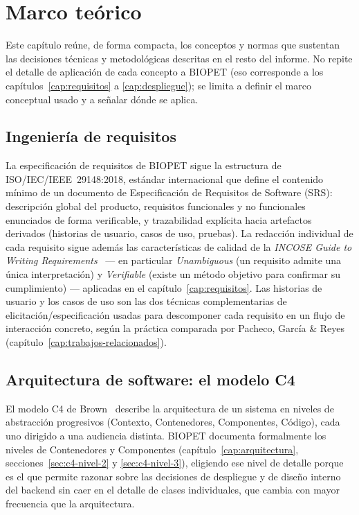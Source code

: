 \chapter{Marco te\'orico}
\label{cap:marco-teorico}

Este cap\'itulo re\'une, de forma compacta, los conceptos y normas que
sustentan las decisiones t\'ecnicas y metodol\'ogicas descritas en el resto
del informe. No repite el detalle de aplicaci\'on de cada concepto a
BIOPET (eso corresponde a los cap\'itulos~\ref{cap:requisitos} a
\ref{cap:despliegue}); se limita a definir el marco conceptual usado y a
se\~nalar d\'onde se aplica.

\section{Ingenier\'ia de requisitos}

La especificaci\'on de requisitos de BIOPET sigue la estructura de
ISO/IEC/IEEE~29148:2018, est\'andar internacional que define el contenido
m\'inimo de un documento de Especificaci\'on de Requisitos de Software
(SRS): descripci\'on global del producto, requisitos funcionales y no
funcionales enunciados de forma verificable, y trazabilidad expl\'icita
hacia artefactos derivados (historias de usuario, casos de uso, pruebas).
La redacci\'on individual de cada requisito sigue adem\'as las
caracter\'isticas de calidad de la \emph{INCOSE Guide to Writing
Requirements}~\cite{incose2023requirements} --- en particular
\emph{Unambiguous} (un requisito admite una \'unica interpretaci\'on) y
\emph{Verifiable} (existe un m\'etodo objetivo para confirmar su
cumplimiento) --- aplicadas en el cap\'itulo~\ref{cap:requisitos}. Las
historias de usuario y los casos de uso son las dos t\'ecnicas
complementarias de elicitaci\'on/especificaci\'on usadas para descomponer
cada requisito en un flujo de interacci\'on concreto, seg\'un la pr\'actica
comparada por Pacheco, Garc\'ia \& Reyes~\cite{pacheco2018requirements}
(cap\'itulo~\ref{cap:trabajos-relacionados}).

\section{Arquitectura de software: el modelo C4}

El modelo C4 de Brown~\cite{c4-model} describe la arquitectura de un
sistema en niveles de abstracci\'on progresivos (Contexto, Contenedores,
Componentes, C\'odigo), cada uno dirigido a una audiencia distinta. BIOPET
documenta formalmente los niveles de Contenedores y Componentes
(cap\'itulo~\ref{cap:arquitectura}, secciones~\ref{sec:c4-nivel-2} y
\ref{sec:c4-nivel-3}), eligiendo ese nivel de detalle porque es el que
permite razonar sobre las decisiones de despliegue y de dise\~no interno
del backend sin caer en el detalle de clases individuales, que cambia con
mayor frecuencia que la arquitectura.

